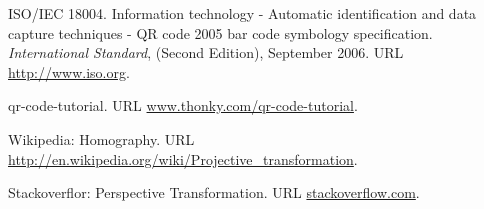 \documentclass[a4paper, 11pt, oneside]{Thesis}  %
\begin{document}






\label{Bibliography}
\begin{thebibliography}{9}

ISO/IEC 18004. Information technology - Automatic identification and data capture
techniques - QR code 2005 bar code symbology specification. \textit{International Standard}, (Second Edition), September 2006. URL \url{http://www.iso.org}.

qr-code-tutorial. URL \url{www.thonky.com/qr-code-tutorial}.

Wikipedia: Homography. URL \url{http://en.wikipedia.org/wiki/Projective_transformation}.

Stackoverflor: Perspective Transformation. URL \url{stackoverflow.com}.

\end{thebibliography}






\end{document}
